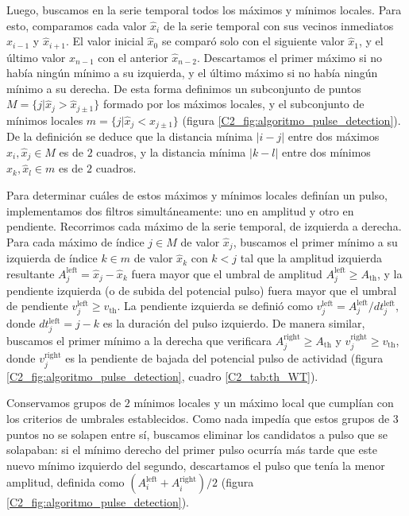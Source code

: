 \documentclass[./main.tex]{subfiles}
\begin{document}
Luego, buscamos en la serie temporal todos los máximos y mínimos locales. Para esto, comparamos cada valor $\hat{x}_i$ de la serie temporal con sus vecinos inmediatos $ \hat{x}_{i-1}$ y $ \hat{x}_{i+1}$. El valor inicial $\hat{x}_0$ se comparó solo con el siguiente valor $\hat{x}_1$, y el último valor $\hat{x}_{n-1}$ con el anterior $ \hat{x}_{n-2}$. Descartamos el primer máximo si no había ningún mínimo a su izquierda, y el último máximo si no había ningún mínimo a su derecha. De esta forma definimos un subconjunto de puntos $ M = \lbrace j | \hat{x}_j > \hat{x}_{j \pm 1}\rbrace$ formado por los máximos locales, y el subconjunto de mínimos locales $ m = \lbrace j | \hat{x}_j < \hat{x}_{j \pm 1}\rbrace$ (figura \ref{C2_fig:algoritmo_pulse_detection}). De la definición se deduce que la distancia mínima $|i-j|$ entre dos máximos $\hat{x}_i, \hat{x}_j \in M$ es de $2$ cuadros, y la distancia mínima $|k-l|$ entre dos mínimos $\hat{x}_k, \hat{x}_l \in m$ es de $2$ cuadros. 


Para determinar cuáles de estos máximos y mínimos locales definían un pulso, implementamos dos filtros simultáneamente: uno en amplitud y otro en pendiente. Recorrimos cada máximo de la serie temporal, de izquierda a derecha. Para cada máximo de índice $j \in M$ de valor $\hat{x}_j$, buscamos el primer mínimo a su izquierda de índice $k \in m$ de valor $\hat{x}_k$ con $k < j$ tal que la amplitud izquierda resultante $A_j^{\text{left}} = \hat{x}_j-\hat{x}_k$ fuera mayor que el umbral de amplitud $A_j^{\text{left}} \geq A_{\text{th}}$, y la pendiente izquierda (o de subida del potencial pulso) fuera mayor que el umbral de pendiente $v_j^{\text{left}} \geq v_{\text{th}}$. La pendiente izquierda se definió como $v_j^{\text{left}} = A_j^{\text{left}}/ dt_j^{\text{left}}$, donde $dt_j^{\text{left}}=j-k$ es la duración del pulso izquierdo. De manera similar, buscamos el primer mínimo a la derecha que verificara $A_j^{\text{right}} \geq A_{\text{th}}$  y $v_j^{\text{right}} \geq v_{\text{th}}$, donde $v_j^{\text{right}}$ es la pendiente de bajada del potencial pulso de actividad  (figura \ref{C2_fig:algoritmo_pulse_detection}, cuadro \ref{C2_tab:th_WT}).


Conservamos grupos de $2$ mínimos locales y un máximo local que cumplían con los criterios de umbrales establecidos. Como nada impedía que estos grupos de $3$ puntos no se solapen entre sí, buscamos eliminar los candidatos a pulso que se solapaban: si el mínimo derecho del primer pulso ocurría más tarde que este nuevo mínimo izquierdo del segundo, descartamos el pulso que tenía la menor amplitud, definida como $ (A_i^{\text{left}} +  A_i^{\text{right}})/2$ (figura \ref{C2_fig:algoritmo_pulse_detection}).
\end{document}
